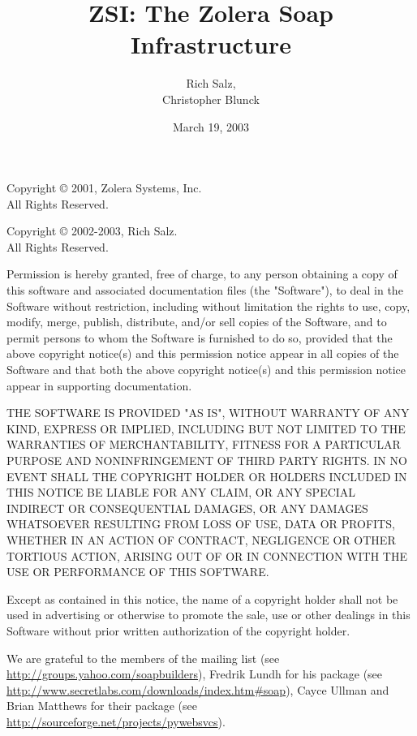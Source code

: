 \documentclass{manual}
\title{ZSI: The Zolera Soap Infrastructure}
\author{Rich Salz,\\
        Christopher Blunck}
\date{March 19, 2003}%
\begin{document}
\maketitle


\centerline{}

Copyright \copyright{} 2001, Zolera Systems, Inc.\\
All Rights Reserved.

Copyright \copyright{} 2002-2003, Rich Salz.\\
All Rights Reserved.

Permission is hereby granted, free of charge, to any person obtaining a
copy of this software and associated documentation files (the "Software"),
to deal in the Software without restriction, including without limitation
the rights to use, copy, modify, merge, publish, distribute, and/or
sell copies of the Software, and to permit persons to whom the Software
is furnished to do so, provided that the above copyright notice(s) and
this permission notice appear in all copies of the Software and that
both the above copyright notice(s) and this permission notice appear in
supporting documentation.

THE SOFTWARE IS PROVIDED "AS IS", WITHOUT WARRANTY OF ANY KIND,
EXPRESS OR IMPLIED, INCLUDING BUT NOT LIMITED TO THE WARRANTIES OF
MERCHANTABILITY, FITNESS FOR A PARTICULAR PURPOSE AND NONINFRINGEMENT
OF THIRD PARTY RIGHTS. IN NO EVENT SHALL THE COPYRIGHT HOLDER OR HOLDERS
INCLUDED IN THIS NOTICE BE LIABLE FOR ANY CLAIM, OR ANY SPECIAL INDIRECT
OR CONSEQUENTIAL DAMAGES, OR ANY DAMAGES WHATSOEVER RESULTING FROM LOSS
OF USE, DATA OR PROFITS, WHETHER IN AN ACTION OF CONTRACT, NEGLIGENCE
OR OTHER TORTIOUS ACTION, ARISING OUT OF OR IN CONNECTION WITH THE USE
OR PERFORMANCE OF THIS SOFTWARE.

Except as contained in this notice, the name of a copyright holder
shall not be used in advertising or otherwise to promote the sale, use
or other dealings in this Software without prior written authorization
of the copyright holder.

\vspace{1.5cm}

\centerline{}

We are grateful to the members of the 
mailing list (see \url{http://groups.yahoo.com/soapbuilders}),
Fredrik Lundh for his  package (see
\url{http://www.secretlabs.com/downloads/index.htm\#soap}),
Cayce Ullman and Brian Matthews for their  package
(see \url{http://sourceforge.net/projects/pywebsvcs}).
\end{document}
